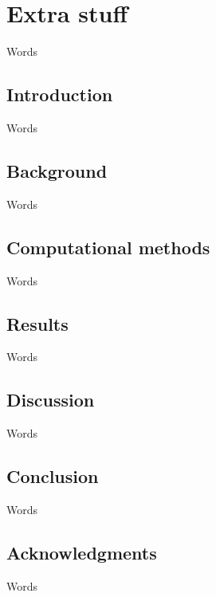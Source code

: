 
\chapter{Extra stuff}
\author{whatever}

\label{extras}
Words

 
\section{Introduction}
Words

\section{Background} Words

%
\section{Computational methods}
Words
 
 \section{Results}
 Words

\section{Discussion}
Words

\section{Conclusion}
Words

\section{Acknowledgments}
Words



%
%

